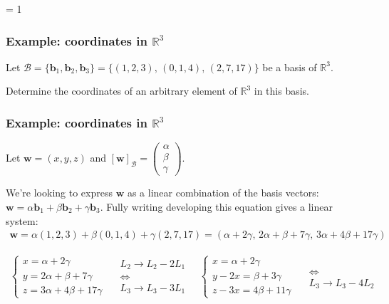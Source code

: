 \documentclass[usenames,dvipsnames,aspectratio=169,10pt]{beamer}
\def \EXAMPLEVERSION {3} %
\numberwithin{equation}{section}
\begin{document}
\ifnum \EXAMPLEVERSION = 1
\begin{frame}
\frametitle{Example: coordinates in $\mathbb{R}^3$}

Let $\mathcal{B} = \{\mathbf{b}_1, \mathbf{b}_2, \mathbf{b}_3 \} = \{(1,2,3), \, (0,1,4), \, (2,7,17) \}$ be a basis of $\mathbb{R}^3$.

Determine the coordinates of an arbitrary element of $\mathbb{R}^3$ in this basis.
\end{frame}





\begin{frame}
\frametitle{Example: coordinates in $\mathbb{R}^3$}
\vspace{0.5cm}
Let $\mathbf{w}=(x,y,z)$ and $[\mathbf{w}]_\mathcal{B}=\begin{pmatrix}\alpha \\ \beta \\ \gamma \end{pmatrix}$.

We're looking to express $\mathbf{w}$ as a linear combination of the basis vectors: $\mathbf{w} = \alpha \mathbf{b}_1 + \beta \mathbf{b}_2  + \gamma \mathbf{b}_3$. Fully writing developing this equation gives a linear system:
\begin{align*}
\mathbf{w} = \alpha(1,2,3) + \beta (0,1,4)  + \gamma (2,7,17) = (\alpha + 2\gamma, \, 2\alpha +  \beta + 7\gamma, \, 3\alpha + 4\beta + 17 \gamma)
\end{align*}

\begin{align*}
\begin{cases}
x =  \alpha +           2\gamma \\
y = 2\alpha +  \beta +  7\gamma \\
z = 3\alpha + 4\beta + 17\gamma
\end{cases}
%
\quad
\begin{matrix}
L_2 \to L_2 - 2L_1 \\
\iff \\
L_3 \to L_3 - 3L_1 
\end{matrix}
%
\quad
\begin{cases}
x =  \alpha + 2\gamma \\
y-2x = \beta + 3\gamma \\
z-3x = 4\beta + 11\gamma
\end{cases}
%
\quad
\begin{matrix}
 \\
\iff \\
L_3 \to L_3 - 4L_2 
\end{matrix}
\end{align*}
\end{frame}
\end{document}
